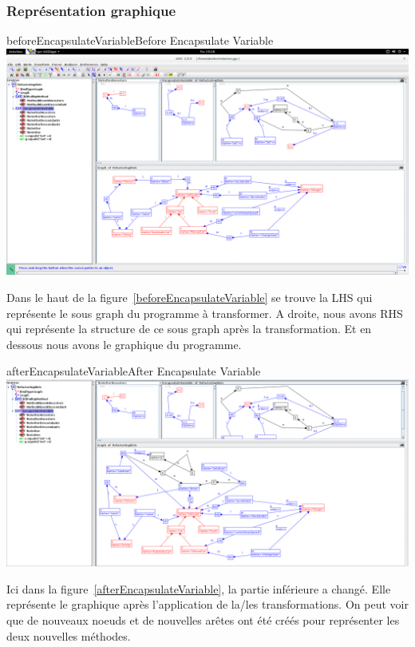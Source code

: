 \documentclass[a4paper, 12pt]{article}
\begin{document}
  \subsubsection{Représentation graphique}

  \begin{myfig}{beforeEncapsulateVariable}{Before Encapsulate Variable}
    \includegraphics[width=\textwidth]{beforeEncapsulateVariable.png}
  \end{myfig}

  Dans le haut de la figure~\ref{beforeEncapsulateVariable} se trouve la LHS qui représente le sous graph du programme à transformer.
  A droite, nous avons RHS qui représente la structure de ce sous graph après la transformation.
  Et en dessous nous avons le graphique du programme.

  \begin{myfig}{afterEncapsulateVariable}{After Encapsulate Variable}
    \includegraphics[width=\textwidth]{afterEncapsulateVariable.png}
  \end{myfig}

  Ici dans la figure~\ref{afterEncapsulateVariable}, la partie inférieure a changé.
  Elle représente le graphique après l'application de la/les transformations. On peut voir que de nouveaux noeuds et de nouvelles arêtes ont été créés pour représenter les deux nouvelles méthodes.
\end{document}
